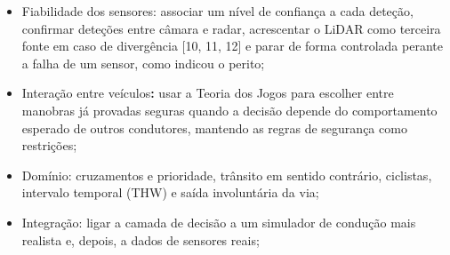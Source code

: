 \begin{itemize}
  \item Fiabilidade dos sensores: associar um nível de confiança a cada deteção, confirmar deteções entre câmara e radar, acrescentar o LiDAR como terceira fonte em caso de divergência [10, 11, 12] e parar de forma controlada perante a falha de um sensor, como indicou o perito;
  \item Interação entre veículos\textbf{:} usar a Teoria dos Jogos para escolher entre manobras já provadas seguras quando a decisão depende do comportamento esperado de outros condutores, mantendo as regras de segurança como restrições;
  \item Domínio: cruzamentos e prioridade, trânsito em sentido contrário, ciclistas, intervalo temporal (THW) e saída involuntária da via;
  \item Integração: ligar a camada de decisão a um simulador de condução mais realista e, depois, a dados de sensores reais;
\end{itemize}
